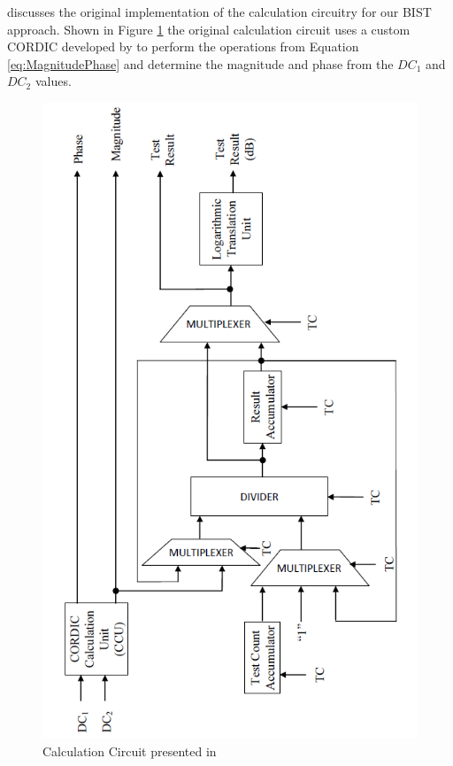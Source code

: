 \documentclass[12pt]{report}
\begin{document}
\cite{joey} discusses the original implementation of the calculation circuitry for our BIST approach.  Shown in Figure \ref{fig:joeycalc} the original calculation circuit uses a custom CORDIC developed by \cite{joey} to perform the operations from Equation \ref{eq:MagnitudePhase} and determine the magnitude and phase from the $DC_1$ and $DC_2$ values.
\begin{figure}
	\begin{center}
		\includegraphics[scale=1]{images/joey-calculation}
	\end{center}
	\caption{Calculation Circuit presented in \cite{joey}}
	\label{fig:joeycalc}
\end{figure}
\end{document}
